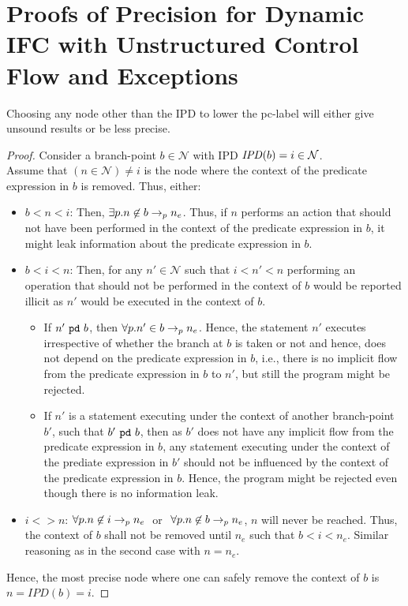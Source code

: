 \clearpage
\section{Proofs of Precision for Dynamic IFC with Unstructured Control
  Flow and Exceptions}
\label{app:exc-pre}
\begin{myThm}[Precision]\label{app:thm1:exc}
Choosing any node other than the IPD to lower the pc-label will either
give unsound results or be less precise.
\end{myThm}
\begin{proof}
Consider a branch-point $b \in \mathcal{N}$ with IPD $\mathit{IPD}(b) = i \in
\mathcal{N}$. \\ 
Assume that $(n \in \mathcal{N} )\neq i$ is the node where the context 
of the predicate expression in $b$ is removed. Thus, either:
\begin{itemize}
\item $b < n < i$: Then, $\exists p. n \not\in b \rightarrow_p n_e$. Thus,
  if $n$ performs an action that should not 
  have been performed in the context of the predicate expression in
  $b$, it might leak information about the predicate expression in
  $b$. 
\item $b < i < n$: Then, for any $n' \in \mathcal{N}$ such that  $i <
  n' < n$ performing an operation that should not be performed in the context of $b$ would
  be reported illicit as $n'$ would be executed in the context of
  $b$. 
\begin{itemize}
\item   If $n'~\texttt{pd}~b$, then $\forall p. n' \in b \rightarrow_p n_e$. Hence, the
      statement $n'$ executes   irrespective of whether 
      the branch at $b$ is taken or not and hence,   does not depend on
      the predicate expression in $b$, i.e., there is   no implicit flow
      from the predicate expression in $b$ to $n'$, but   still the
      program might be rejected. 
\item   If $n'$ is a statement executing under the context of another
      branch-point $b'$, such that $b'~\texttt{pd}~b$, then as $b'$ does
      not have any implicit flow from the predicate expression in $b$, any
      statement executing under the context of the prediate expression in
      $b'$ should not be influenced by the context of the predicate
      expression in $b$. Hence, the program might be rejected even though
      there is no information leak.
\end{itemize} 
\item $i <> n$: $\forall p.n \not\in i \rightarrow_p n_e~$ or $~\forall p.n
  \not\in b \rightarrow_p n_e$, $n$ will never be reached. Thus, the context
  of $b$ shall not be removed until $n_e$ such that $b < i <
  n_e$. Similar reasoning as  in the second case with $n = n_e$.
\end{itemize} 
 Hence, the most precise node where one can safely remove the context of
$b$ is $n =\mathit{IPD}(b) = i$.
\end{proof}

